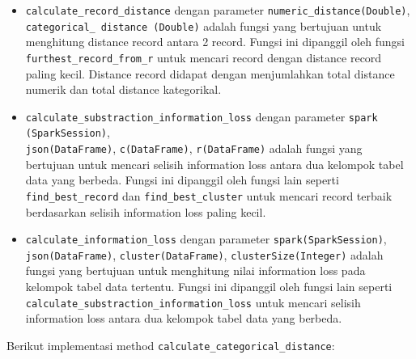 \begin{itemize}
\item \texttt{calculate\_record\_distance} dengan parameter \texttt{numeric\_distance(Double)}, \texttt{categorical\_ distance (Double)} adalah fungsi yang bertujuan untuk menghitung distance record antara 2 record. Fungsi ini dipanggil oleh fungsi \texttt{furthest\_record\_from\_r} untuk mencari record dengan distance record paling kecil. Distance record didapat dengan menjumlahkan total distance numerik dan total distance kategorikal.

\item \texttt{calculate\_substraction\_information\_loss} dengan parameter  \texttt{spark (SparkSession)}, \\ \texttt{json(DataFrame)}, \texttt{c(DataFrame)}, \texttt{r(DataFrame)} adalah fungsi yang bertujuan untuk mencari selisih information loss antara dua kelompok tabel data yang berbeda. Fungsi ini dipanggil oleh fungsi lain seperti \texttt{find\_best\_record} dan \texttt{find\_best\_cluster} untuk mencari record terbaik berdasarkan selisih  information loss paling kecil.

\item \texttt{calculate\_information\_loss} dengan parameter \texttt{spark(SparkSession)}, \texttt{json(DataFrame)}, \texttt{cluster(DataFrame)}, \texttt{clusterSize(Integer)} adalah fungsi yang bertujuan untuk menghitung nilai information loss pada kelompok tabel data tertentu. Fungsi ini dipanggil oleh fungsi lain seperti \texttt{calculate\_substraction\_information\_loss} untuk mencari selisih information loss antara dua kelompok tabel data yang berbeda.

\end{itemize}

\noindent Berikut implementasi method \texttt{calculate\_categorical\_distance}:

